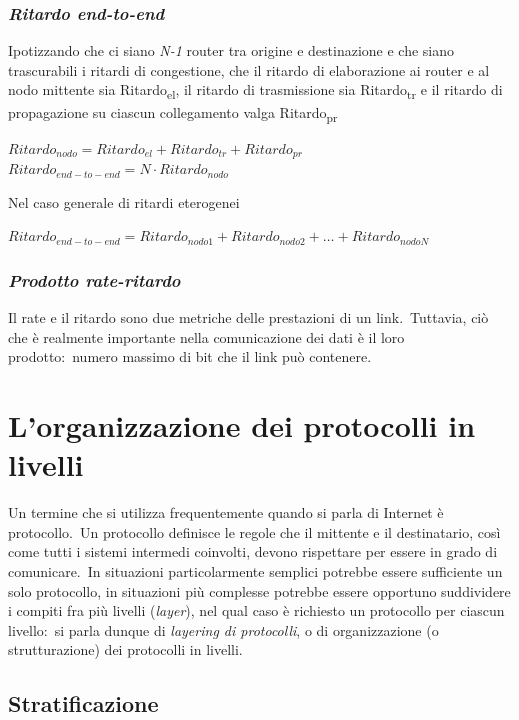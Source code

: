 \subsubsection{\emph{Ritardo end-to-end}}

Ipotizzando che ci siano \emph{N-1} router tra origine e destinazione e che siano trascurabili i ritardi di congestione, che il ritardo di elaborazione ai router e al nodo mittente sia Ritardo\textsubscript{el}, il ritardo di trasmissione sia Ritardo\textsubscript{tr} e il ritardo di propagazione su ciascun collegamento valga Ritardo\textsubscript{pr}
\begin{center}
    $Ritardo_{nodo} = Ritardo_{el} + Ritardo_{tr} + Ritardo_{pr} $\\
    $Ritardo_{end-to-end} = N\cdot Ritardo_{nodo}$
\end{center}
Nel caso generale di ritardi eterogenei
\begin{center}
    $Ritardo_{end-to-end} = Ritardo_{nodo1} + Ritardo_{nodo2} + \dots + Ritardo_{nodoN}$
\end{center}

\subsubsection{\emph{Prodotto rate-ritardo}}

Il rate e il ritardo sono due metriche delle prestazioni di un link.\
Tuttavia, ciò che è realmente importante nella comunicazione dei dati è il loro prodotto:\ numero massimo di bit che il link può contenere.

\section{L'organizzazione dei protocolli in livelli}

Un termine che si utilizza frequentemente quando si parla di Internet è protocollo.\
Un protocollo definisce le regole che il mittente e il destinatario, così come tutti i sistemi intermedi coinvolti, devono rispettare per essere in grado di comunicare.\
In situazioni particolarmente semplici potrebbe essere sufficiente un solo protocollo, in situazioni più complesse potrebbe essere opportuno suddividere i compiti fra più livelli (\emph{layer}), nel qual caso è richiesto un protocollo per ciascun livello:\ si parla dunque di \emph{layering di protocolli}, o di organizzazione (o strutturazione) dei protocolli in livelli.

\subsection{Stratificazione}

